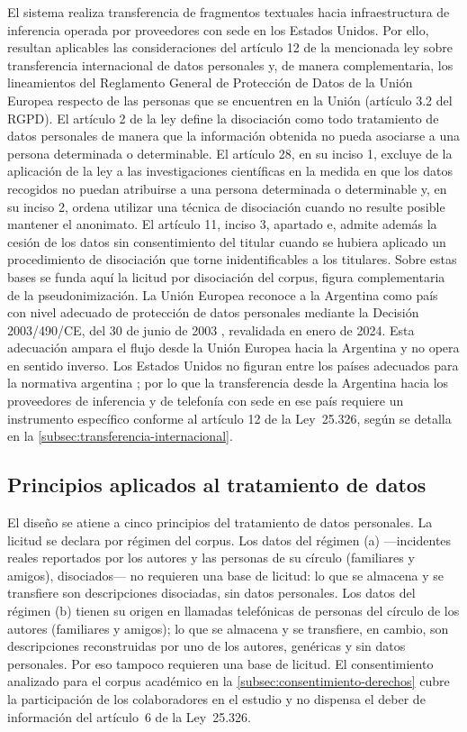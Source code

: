 El sistema realiza transferencia de fragmentos textuales hacia infraestructura de inferencia operada por proveedores con sede en los Estados Unidos. Por ello, resultan aplicables las consideraciones del artículo 12 de la mencionada ley sobre transferencia internacional de datos personales y, de manera complementaria, los lineamientos del Reglamento General de Protección de Datos de la Unión Europea \parencite{GDPR2016} respecto de las personas que se encuentren en la Unión (artículo 3.2 del RGPD). El artículo 2 de la ley define la disociación como todo tratamiento de datos personales de manera que la información obtenida no pueda asociarse a una persona determinada o determinable. El artículo 28, en su inciso 1, excluye de la aplicación de la ley a las investigaciones científicas en la medida en que los datos recogidos no puedan atribuirse a una persona determinada o determinable y, en su inciso 2, ordena utilizar una técnica de disociación cuando no resulte posible mantener el anonimato. El artículo 11, inciso 3, apartado e, admite además la cesión de los datos sin consentimiento del titular cuando se hubiera aplicado un procedimiento de disociación que torne inidentificables a los titulares. Sobre estas bases se funda aquí la licitud por disociación del corpus, figura complementaria de la pseudonimización. La Unión Europea reconoce a la Argentina como país con nivel adecuado de protección de datos personales mediante la Decisión 2003/490/CE, del 30 de junio de 2003 \parencite{Decision2003_490_CE}, revalidada en enero de 2024. Esta adecuación ampara el flujo desde la Unión Europea hacia la Argentina y no opera en sentido inverso. Los Estados Unidos no figuran entre los países adecuados para la normativa argentina \parencite{DNPDP2016_disposicion60}; por lo que la transferencia desde la Argentina hacia los proveedores de inferencia y de telefonía con sede en ese país requiere un instrumento específico conforme al artículo 12 de la Ley~25.326, según se detalla en la \autoref{subsec:transferencia-internacional}.

\subsection{Principios aplicados al tratamiento de datos}\label{subsec:principios-datos}

El diseño se atiene a cinco principios del tratamiento de datos personales. La licitud se declara por régimen del corpus. Los datos del régimen (a) ---incidentes reales reportados por los autores y las personas de su círculo (familiares y amigos), disociados--- no requieren una base de licitud: lo que se almacena y se transfiere son descripciones disociadas, sin datos personales. Los datos del régimen (b) tienen su origen en llamadas telefónicas de personas del círculo de los autores (familiares y amigos); lo que se almacena y se transfiere, en cambio, son descripciones reconstruidas por uno de los autores, genéricas y sin datos personales. Por eso tampoco requieren una base de licitud. El consentimiento analizado para el corpus académico en la \autoref{subsec:consentimiento-derechos} cubre la participación de los colaboradores en el estudio y no dispensa el deber de información del artículo~6 de la Ley~25.326.

